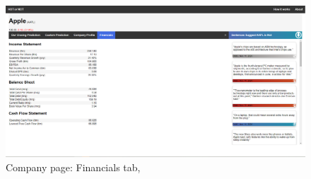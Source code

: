 \documentclass{l4proj}
\begin{document}
\begin{appendices}
\bigskip

\begin{figure}[h]
    \centering
    \includegraphics[width=\linewidth]{images/upload/a_fintab.PNG}
    \caption{Company page: Financials tab, }
    \label{fig:a_fin}
\end{figure}








\end{appendices}






\end{document}
